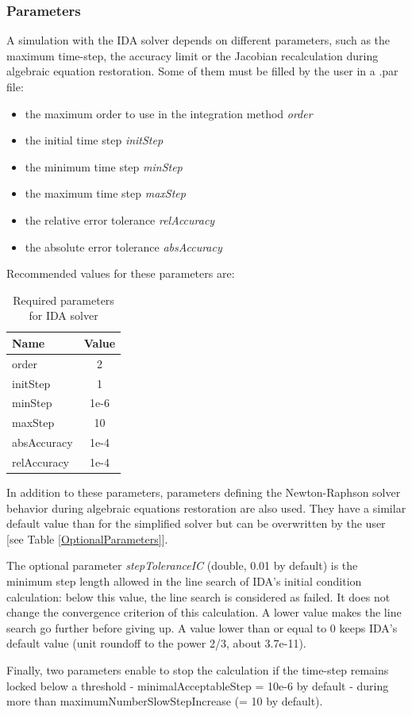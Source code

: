 \documentclass[a4paper, 12pt]{report}
\begin{document}
\subsubsection{Parameters}

A simulation with the \ac{IDA} solver depends on different parameters, such as the maximum time-step, the accuracy limit or the Jacobian recalculation during algebraic equation restoration. Some of them must be filled by the user in a .par file:
\begin{itemize}
\item the maximum order to use in the integration method \textit{order}
\item the initial time step \textit{initStep}
\item the minimum time step \textit{minStep}
\item the maximum time step \textit{maxStep}
\item the relative error tolerance \textit{relAccuracy}
\item the absolute error tolerance \textit{absAccuracy}
\end{itemize}

Recommended values for these parameters are:
\begin{table}[h!]
\center
\begin{tabular}{ l | c }
\toprule
\textbf{{Name}} & \textbf{{Value}} \\
\midrule
order & 2 \\
initStep & 1 \\
minStep & 1e-6 \\
maxStep & 10 \\
absAccuracy & 1e-4 \\
relAccuracy & 1e-4 \\
\bottomrule
\end{tabular}
\caption{Required parameters for \ac{IDA} solver}
\end{table}

In addition to these parameters, parameters defining the Newton-Raphson solver behavior during algebraic equations restoration are also used. They have a similar default value than for the simplified solver but can be overwritten by the user [see Table \ref{OptionalParameters}].

The optional parameter \textit{stepToleranceIC} (double, 0.01 by default) is the minimum step length allowed in the line search of \ac{IDA}'s initial condition calculation: below this value, the line search is considered as failed. It does not change the convergence criterion of this calculation. A lower value makes the line search go further before giving up. A value lower than or equal to 0 keeps \ac{IDA}'s default value (unit roundoff to the power 2/3, about 3.7e-11).

Finally, two parameters enable to stop the calculation if the time-step remains locked below a threshold - minimalAcceptableStep = 10e-6 by default - during more than
maximumNumberSlowStepIncrease (= 10 by default).


\end{document}

